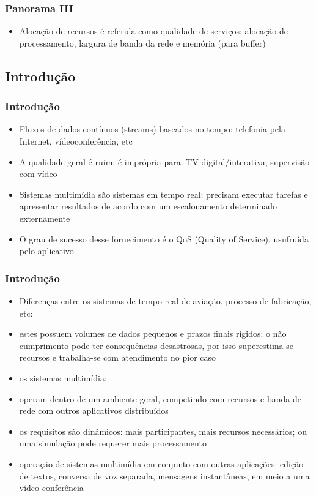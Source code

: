 \documentclass[]{beamer}
\begin{document}
\begin{frame}
  \frametitle{Panorama III}
\begin{itemize}
  \item Alocação de recursos é referida como qualidade de serviços: alocação de processamento,
largura de banda da rede e memória (para buffer)
\end{itemize}
\end{frame}

\subsection{Introdução}

\begin{frame}
  \frametitle{Introdução}
\begin{itemize}
  \item Fluxos de dados contínuos (streams) baseados no tempo: telefonia pela Internet, 
vídeoconferência, etc
  \item A qualidade geral é ruim; é imprópria para: TV digital/interativa, supervisão com vídeo
  \item Sistemas multimídia são sistemas em tempo real: precisam executar tarefas e apresentar
resultados de acordo com um escalonamento determinado externamente
  \item O grau de sucesso desse fornecimento é o QoS (Quality of Service), usufruída
pelo aplicativo
\end{itemize}
\end{frame}

\begin{frame}
  \frametitle{Introdução}
\begin{itemize}
  \item Diferenças entre os sistemas de tempo real de aviação, processo de fabricação, etc: 
  \item estes possuem volumes de dados pequenos e prazos finais rígidos; o não cumprimento pode ter
consequências desastrosas, por isso superestima-se recursos e trabalha-se com atendimento 
no pior caso
  \item os sistemas multimídia:
  \item operam dentro de um ambiente geral, competindo com recursos e banda de rede com
 outros aplicativos distribuídos
  \item os requisitos são dinâmicos: mais participantes, mais recursos necessários; ou uma 
simulação pode requerer mais processamento
  \item operação de sistemas multimídia em conjunto com outras aplicações: edição de textos, 
conversa de voz separada, mensagens instantâneas, em meio a uma vídeo-conferência
\end{itemize}
\end{frame}
\end{document}
